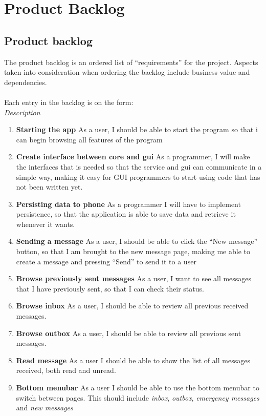 \chapter{Product Backlog}
\section{Product backlog}
The product backlog is an ordered list of ``requirements'' for the project. Aspects taken into consideration when ordering the backlog include business value and dependencies.\\\\
		Each entry in the backlog is on the form:\\
			 {\it Description}
		
		\begin{enumerate}
			\item {\bf Starting the app} As a user, I should be able to start the program so that i can begin browsing all features of the program
			\item {\bf Create interface between core and gui} As a programmer, I will make the interfaces that is needed so that the service and gui can communicate in a simple way, making it easy for GUI programmers to start using code that has not been written yet.
			\item {\bf Persisting data to phone} As a programmer I will have to implement persistence, so that the application is able to save data and retrieve it whenever it wants.
			\item {\bf Sending a message} As a user, I should be able to click the ``New message'' button, so that I am brought to the new message page, making me able to create a message and pressing ``Send'' to send it to a user
			\item {\bf Browse previously sent messages} As a user, I want to see all messages that I have previously sent, so that I can check their status.
			\item {\bf Browse inbox} As a user, I should be able to review all previous received messages.
			\item {\bf Browse outbox} As a user, I should be able to review all previous sent messages.
			\item {\bf{Read message}} As a user I should be able to show the list of all messages received, both read and unread.
			\item {\bf Bottom menubar} As a user I should be able to use the bottom menubar to switch between pages. This should include {\it inbox}, {\it outbox}, {\it emergency messages} and {\it new messages}

\end{enumerate}
